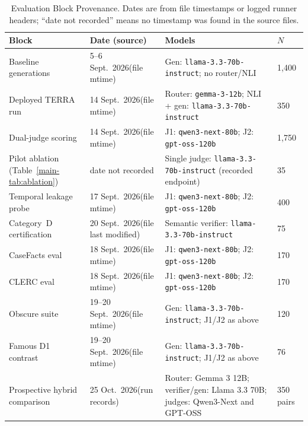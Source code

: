 \par\begingroup
  
  \small
  
  
  \begin{longtable}{@{}p{3.8cm}p{2.2cm}p{5.2cm}p{1.4cm}@{}}
\caption{Evaluation Block Provenance. Dates are from file timestamps or
           logged runner headers; ``date not recorded'' means no timestamp
           was found in the source files.}\label{tab:run_provenance}\\
    \toprule
    \textbf{Block} & \textbf{Date (source)} & \textbf{Models} & \textbf{$N$} \\
    \midrule
    Baseline generations & 5--6 Sept.\ 2026\newline (file mtime) &
      Gen: \texttt{llama-3.3-70b-instruct}; no router/NLI &
      1,400 \\
    \addlinespace
    Deployed TERRA run & 14 Sept.\ 2026\newline (file mtime) &
      Router: \texttt{gemma-3-12b}; NLI + gen: \texttt{llama-3.3-70b-instruct} &
      350 \\
    \addlinespace
    Dual-judge scoring & 14 Sept.\ 2026\newline (file mtime) &
      J1: \texttt{qwen3-next-80b}; J2: \texttt{gpt-oss-120b} &
      1,750 \\
    \addlinespace
    Pilot ablation (Table~\ref{main-tab:ablation}) & date not recorded &
      Single judge: \texttt{llama-3.3-70b-instruct} (recorded endpoint) & 35 \\
    \addlinespace
    Temporal leakage probe & 17 Sept.\ 2026\newline (file mtime) &
      J1: \texttt{qwen3-next-80b}; J2: \texttt{gpt-oss-120b} & 400 \\
    \addlinespace
    Category~D certification & 20 Sept.\ 2026\newline (file last modified) &
      Semantic verifier: \texttt{llama-3.3-70b-instruct} & 75 \\
    \addlinespace
    CaseFacts eval & 18 Sept.\ 2026\newline (file mtime) &
      J1: \texttt{qwen3-next-80b}; J2: \texttt{gpt-oss-120b} & 170 \\
    \addlinespace
    CLERC eval & 18 Sept.\ 2026\newline (file mtime) &
      J1: \texttt{qwen3-next-80b}; J2: \texttt{gpt-oss-120b} & 170 \\
    \addlinespace
    Obscure suite & 19--20 Sept.\ 2026\newline (file mtime) &
      Gen: \texttt{llama-3.3-70b-instruct}; J1/J2 as above &
      120 \\
    \addlinespace
    Famous D1 contrast & 19--20 Sept.\ 2026\newline (file mtime) &
      Gen: \texttt{llama-3.3-70b-instruct}; J1/J2 as above &
      76 \\
    \addlinespace
    Prospective hybrid comparison & 25 Oct.\ 2026\newline (run records) &
      Router: Gemma 3 12B; verifier/gen: Llama 3.3 70B; judges: Qwen3-Next and GPT-OSS & 350 pairs \\
    \bottomrule
  \end{longtable}
